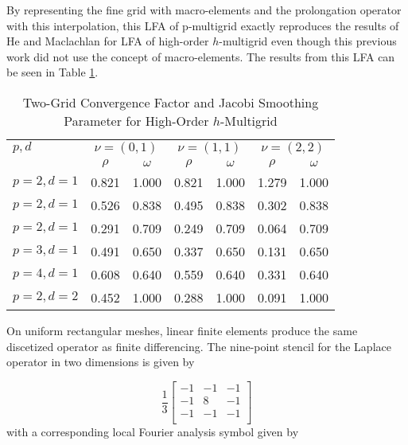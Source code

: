 By representing the fine grid with macro-elements and the prolongation operator with this interpolation, this LFA of p-multigrid exactly reproduces the results of He and Maclachlan \cite{he2020two} for LFA of high-order $h$-multigrid even though this previous work did not use the concept of macro-elements.
The results from this LFA can be seen in Table \ref{table:two_grid_hmultigrid}.

\begin{table}[ht!]
\begin{center}
\begin{tabular}{l cc cc cc}
  \toprule
  $p, d$  &  \multicolumn{2}{c}{$\nu = \left( 0, 1 \right)$}  &  \multicolumn{2}{c}{$\nu = \left( 1, 1 \right)$}  &  \multicolumn{2}{c}{$\nu = \left( 2, 2 \right)$}  \\
                      &  $\rho$  &  $\omega$  &  $\rho$ & $\omega$  &  $\rho$ & $\omega$  \\
  \toprule
  $p = 2, d = 1$  &  0.821 & 1.000  &  0.821 & 1.000  &  1.279 & 1.000   \\
  $p = 2, d = 1$  &  0.526 & 0.838  &  0.495 & 0.838  &  0.302 & 0.838   \\
  $p = 2, d = 1$  &  0.291 & 0.709  &  0.249 & 0.709  &  0.064 & 0.709   \\
  \midrule
  $p = 3, d = 1$  &  0.491 & 0.650  &  0.337 & 0.650  &  0.131 & 0.650   \\
  \midrule
  $p = 4, d = 1$  &  0.608 & 0.640  &  0.559 & 0.640  &  0.331 & 0.640   \\
  \midrule
  $p = 2, d = 2$  &  0.452 & 1.000  &  0.288 & 1.000  &  0.091 & 1.000   \\
  \bottomrule
\end{tabular}
\end{center}
\caption{Two-Grid Convergence Factor and Jacobi Smoothing Parameter for High-Order $h$-Multigrid}
\label{table:two_grid_hmultigrid}
\end{table}

On uniform rectangular meshes, linear finite elements produce the same discetized operator as finite differencing.
The nine-point stencil for the Laplace operator in two dimensions is given by

\begin{equation}
\frac{1}{3}
\begin{bmatrix}
-1  &  -1  &  -1   \\
-1  &   8  &  -1   \\
-1  &  -1  &  -1  \\
\end{bmatrix}
\end{equation}
with a corresponding local Fourier analysis symbol given by

